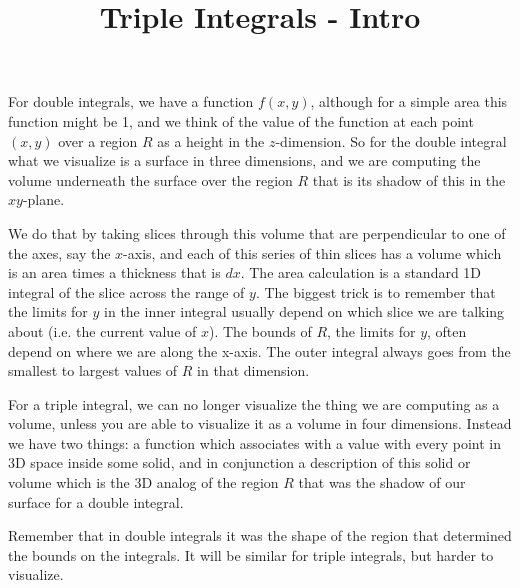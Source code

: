 \documentclass[11pt, oneside]{article}   	%
\title{Triple Integrals - Intro}
\date{}							%
\begin{document}
\maketitle
\Large


For double integrals, we have a function $f(x,y)$, although for a simple area this function might be 1, and we think of the value of the function at each point $(x,y)$ over a region $R$ as a height in the $z$-dimension.  So for the double integral what we visualize is a surface in three dimensions, and  we are computing the volume underneath the surface over the region $R$ that is its shadow of this in the $xy$-plane.

We do that by taking slices through this volume that are perpendicular to one of the axes, say the $x$-axis, and each of this series of thin slices has a volume which is an area times a thickness that is $dx$.  The area calculation is a standard 1D integral of the slice across the range of $y$.  The biggest trick is to remember that the limits for $y$ in the inner integral usually depend on which slice we are talking about (i.e. the current value of $x$).  The bounds of $R$, the limits for $y$, often depend on where we are along the x-axis.  The outer integral always goes from the smallest to largest values of $R$ in that dimension.

For a triple integral, we can no longer visualize the thing we are computing as a volume, unless you are able to visualize it as a volume in four dimensions.  Instead we have two things:  a function which associates with a value with every point in 3D space inside some solid, and in conjunction a description of this solid or volume which is the 3D analog of the region $R$ that was the shadow of our surface for a double integral.

Remember that in double integrals it was the shape of the region that determined the bounds on the integrals.  It will be similar for triple integrals, but harder to visualize.
\end{document}
